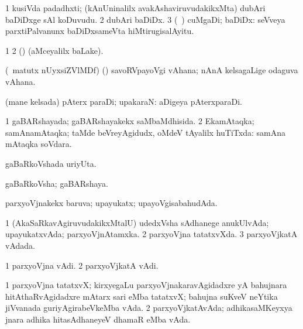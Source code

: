 {{{\bentry
{} 
\gl{\nA}
\bmng
\bnum
\num{1} kusiVda padadhxti; (kAnUninalilx avakAshaviruvudakikxMta) dubAri baDiDxge sAl koDuvudu. 
\num{2} dubAri baDiDx. 
\num{3} (\sA\ \rUpa) cuMgaDi; baDiDx:  seVveya parxtiPalvanunx baDiDxsameVta hiMtirugisalAyitu. 
\enum
\emng
\eentry


\bentry
{}
\gl{\saMkiSx}
\expl{}
\bmng
\bnum
\num{1}  
\num{2} (\ame)  (aMceyalilx baLake). 
\enum
\emng
\eentry

\bentry
{} 
\gl{\nA}
\expl{}
\bmng
(\AseTxrXV\ matutx nUyxsiZVlMDf) (\ashi) savoRVpayoVgi vAhana; nAnA kelsagaLige odaguva vAhana. 
\emng
\eentry

\bentry
{} 
\gl{\nA}
\expl{}
\bmng
(mane kelsada) pAterx paraDi; upakaraN:  aDigeya pAterxparaDi. 
\emng
\eentry

\bentry
{} 
\gl{\gu}
\expl{}
\bmng
\bnum
\num{1} gaBARshayada; gaBARshayakekx saMbaMdhisida. 
\num{2} EkamAtaqka; samAnamAtaqka; taMde beVreyAgidudx, oMdeV tAyalilx huTiTxda:  samAna mAtaqka soVdara. 
\enum
\emng
\eentry

\bentry
{} 
\gl{\nA}
\expl{}
\bmng
gaBaRkoVshada uriyUta. 
\emng
\eentry

\bentry
{} 
\gl{\nA}
\bmng
gaBaRkoVsha; gaBARshaya. 
\emng
\eentry

\bentry
{} 
\gl{\gu}
\bmng
parxyoVjnakekx baruva; upayukatx; upayoVgisabahudAda. 
\emng
\eentry

\bentry
{} 
\gl{\sakirx}
\expl{}
\bmng
{} 
\emng
\eentry

\bentry
{} 
\gl{\gu}
\expl{}
\bmng
\bnum
\num{1} (AkaSaRkavAgiruvudakikxMtalU) udedxVsha sAdhanege anukUlvAda; upayukatxvAda; parxyoVjnAtamxka. 
\num{2} parxyoVjna tatatxvXda. 
\num{3} parxyoVjkatA vAdada. 
\enum
\emng
\eentry

\bentry
{} 
\gl{\nA}
\expl{}
\bmng
\bnum
\num{1} parxyoVjna vAdi. 
\num{2} parxyoVjkatA vAdi. 
\enum
\emng
\eentry

\bentry
{} 
\gl{\nA}
\expl{}
\bmng
\bnum
\num{1} parxyoVjna tatatxvX; kirxyegaLu parxyoVjnakaravAgidadxre yA bahujnara hitAthaRvAgidadxre mAtarx sari eMba tatatxvX; bahujna suKveV neYtika jiVvanada guriyAgirabeVkeMba vAda. 
\num{2} parxyoVjkatAvAda; adhikasaMKeyxya jnara adhika hitasAdhaneyeV dhamaR eMba vAda. 
\enum
\emng
\eentry

}}}
